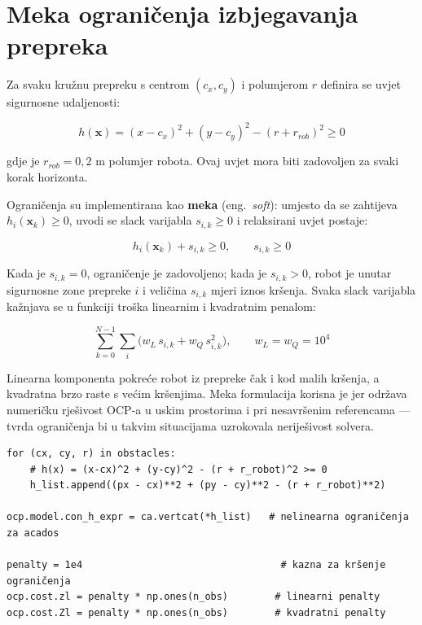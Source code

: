 \section{Meka ograničenja izbjegavanja prepreka}

Za svaku kružnu prepreku s centrom $(c_x, c_y)$ i polumjerom $r$ definira se uvjet sigurnosne udaljenosti:

\begin{equation}
  h(\mathbf{x}) = (x - c_x)^2 + (y - c_y)^2 - (r + r_{rob})^2 \geq 0
\end{equation}

gdje je $r_{rob} = 0{,}2$ m polumjer robota. Ovaj uvjet mora biti zadovoljen za svaki korak horizonta.

Ograničenja su implementirana kao \textbf{meka} (eng.\ \textit{soft}): umjesto da se zahtijeva $h_i(\mathbf{x}_k) \geq 0$, uvodi se slack varijabla $s_{i,k} \geq 0$ i relaksirani uvjet postaje:

\begin{equation}
  h_i(\mathbf{x}_k) + s_{i,k} \geq 0, \qquad s_{i,k} \geq 0
\end{equation}

Kada je $s_{i,k} = 0$, ograničenje je zadovoljeno; kada je $s_{i,k} > 0$, robot je unutar sigurnosne zone prepreke $i$ i veličina $s_{i,k}$ mjeri iznos kršenja. Svaka slack varijabla kažnjava se u funkciji troška linearnim i kvadratnim penalom:

\begin{equation}
  \sum_{k=0}^{N-1} \sum_i \bigl( w_L\, s_{i,k} + w_Q\, s_{i,k}^2 \bigr), \qquad w_L = w_Q = 10^4
\end{equation}

Linearna komponenta pokreće robot iz prepreke čak i kod malih kršenja, a kvadratna brzo raste s većim kršenjima. Meka formulacija korisna je jer održava numeričku rješivost OCP-a u uskim prostorima i pri nesavršenim referencama --- tvrda ograničenja bi u takvim situacijama uzrokovala neriješivost solvera.

\begin{listing}[H]
\begin{verbatim}
for (cx, cy, r) in obstacles:
    # h(x) = (x-cx)^2 + (y-cy)^2 - (r + r_robot)^2 >= 0
    h_list.append((px - cx)**2 + (py - cy)**2 - (r + r_robot)**2)

ocp.model.con_h_expr = ca.vertcat(*h_list)   # nelinearna ograničenja za acados

penalty = 1e4                                  # kazna za kršenje ograničenja
ocp.cost.zl = penalty * np.ones(n_obs)        # linearni penalty
ocp.cost.Zl = penalty * np.ones(n_obs)        # kvadratni penalty
\end{verbatim}
\caption{Implementacija mekih ograničenja prepreka u \texttt{src/mpc\_solver.py}}
\end{listing}

